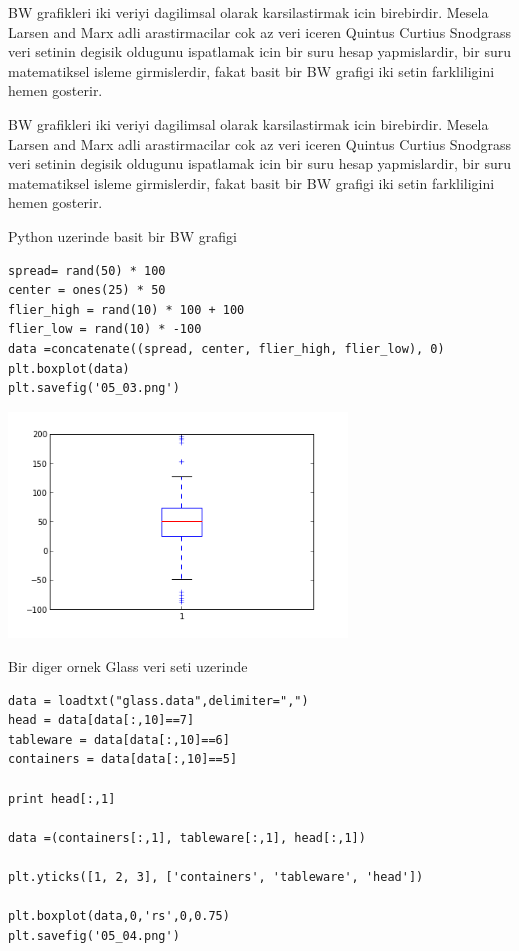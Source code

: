 \documentclass[12pt,fleqn]{article}\usepackage{../common}
\begin{document}
BW grafikleri iki veriyi dagilimsal olarak karsilastirmak icin
birebirdir. Mesela Larsen and Marx adli arastirmacilar cok az veri
iceren Quintus Curtius Snodgrass veri setinin degisik oldugunu
ispatlamak icin bir suru hesap yapmislardir, bir suru matematiksel
isleme girmislerdir, fakat basit bir BW grafigi iki setin farkliligini
hemen gosterir.

BW grafikleri iki veriyi dagilimsal olarak karsilastirmak icin
birebirdir. Mesela Larsen and Marx adli arastirmacilar cok az veri
iceren Quintus Curtius Snodgrass veri setinin degisik oldugunu
ispatlamak icin bir suru hesap yapmislardir, bir suru matematiksel
isleme girmislerdir, fakat basit bir BW grafigi iki setin farkliligini
hemen gosterir.

Python uzerinde basit bir BW grafigi 

\begin{verbatim}
spread= rand(50) * 100
center = ones(25) * 50
flier_high = rand(10) * 100 + 100
flier_low = rand(10) * -100
data =concatenate((spread, center, flier_high, flier_low), 0)
plt.boxplot(data)
plt.savefig('05_03.png')
\end{verbatim}

\includegraphics[height=6cm]{05_03.png}

Bir diger ornek Glass veri seti uzerinde

\begin{verbatim}
data = loadtxt("glass.data",delimiter=",")
head = data[data[:,10]==7]
tableware = data[data[:,10]==6]
containers = data[data[:,10]==5]

print head[:,1]

data =(containers[:,1], tableware[:,1], head[:,1])

plt.yticks([1, 2, 3], ['containers', 'tableware', 'head'])

plt.boxplot(data,0,'rs',0,0.75)
plt.savefig('05_04.png')
\end{verbatim}
\end{document}
